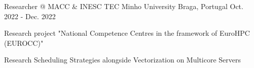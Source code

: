 
\begin{cventries}


\cventry
{Researcher @ MACC \& INESC TEC}
{Minho University} %
{Braga, Portugal} %
{Oct. 2022 - Dec. 2022} %
{ %
\begin{cvitems}
\item{Research project "National Competence Centres in the framework of EuroHPC (EUROCC)"}
\item{Research Scheduling Strategies alongside Vectorization on Multicore Servers}
\end{cvitems}
}

\end{cventries}
